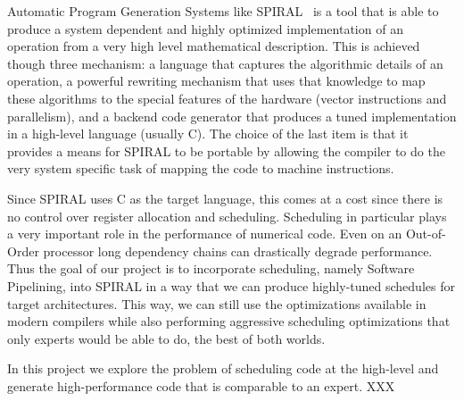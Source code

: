 \documentclass[10pt]{article}
\begin{document}
Automatic Program Generation Systems like SPIRAL~\cite{Pueschel:05} is a tool that is able to produce a system
dependent and highly optimized implementation of an operation from a very high level mathematical description. 
This is achieved though three mechanism: a language that captures the algorithmic details of an operation, a powerful
rewriting mechanism that uses that knowledge to map these algorithms to the special features of the hardware (vector
instructions and parallelism), and a backend code generator that produces a tuned implementation in a high-level language
(usually C). The choice of the last item is that it provides a means for SPIRAL to be portable by allowing the compiler to do the very
system specific task of mapping the code to machine instructions.

Since SPIRAL uses C as the target language, this comes at a cost since there is no control over register allocation and
scheduling. Scheduling in particular plays a very important role in the performance of numerical code. Even on an Out-of-Order
processor long dependency chains can drastically degrade performance. Thus the goal of our project is to incorporate scheduling,
namely Software Pipelining, into SPIRAL in a way that we can produce highly-tuned schedules for target architectures.
This way, we can still use the optimizations available in modern compilers while also performing aggressive scheduling optimizations
that only experts would be able to do, the best of both worlds.

In this project we explore the problem of scheduling code at the high-level and generate high-performance code that is comparable
to an expert. XXX
\end{document}
